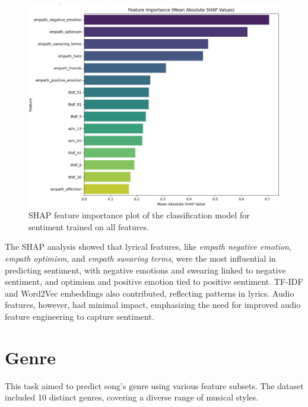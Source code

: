 \begin{center}
\begin{figure}[H]
  \centering
  \includegraphics[width=5in]{img/feature_importance_sentiment.png}
  \caption{SHAP feature importance plot of the classification model for
  sentiment trained on all features.}
  \label{Figure:fig_eh}
\end{figure}
\end{center}

The SHAP analysis showed that lyrical features, like \textit{empath negative
emotion}, \textit{empath optimism}, and \textit{empath swearing terms}, were
the most influential in predicting sentiment, with negative emotions and
swearing linked to negative sentiment, and optimism and positive emotion tied
to positive sentiment. TF-IDF and Word2Vec embeddings also contributed,
reflecting patterns in lyrics. Audio features, however, had minimal impact,
emphasizing the need for improved audio feature engineering to capture
sentiment.

\section{Genre}
\label{sec:genre}

This task aimed to predict song's genre using  various  feature subsets. The
dataset included 10 distinct genres, covering a diverse range of musical
styles.

